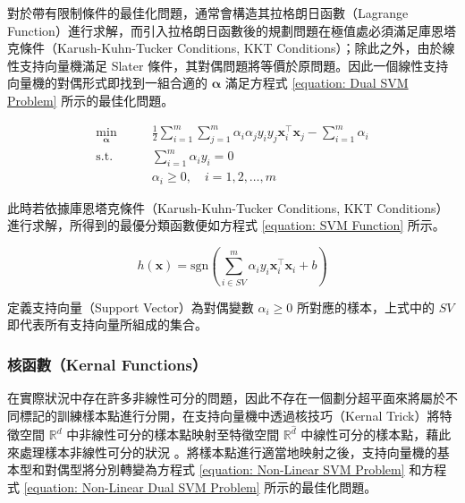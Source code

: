 對於帶有限制條件的最佳化問題，通常會構造其拉格朗日函數（Lagrange Function）進行求解，而引入拉格朗日函數後的規劃問題在極值處必須滿足庫恩塔克條件（Karush-Kuhn-Tucker Conditions, KKT Conditions）；除此之外，由於線性支持向量機滿足 Slater 條件，其對偶問題將等價於原問題。因此一個線性支持向量機的對偶形式即找到一組合適的 $\boldsymbol{\alpha}$ 滿足方程式 \eqref{equation: Dual SVM Problem} 所示的最佳化問題。

\begin{equation}\label{equation: Dual SVM Problem}
  \begin{aligned}
    \min_{\boldsymbol{\alpha}} \qquad & \frac{1}{2} \sum_{i = 1}^{m} \sum_{j = 1}^{m} \alpha_i \alpha_j y_i y_j \boldsymbol{x}_i^{\top} \boldsymbol{x}_j - \sum_{i = 1}^{m} \alpha_{i} \\
    \text{s.t.}                \qquad & \sum_{i = 1}^{m} \alpha_{i} y_{i} = 0 \\
                               \qquad & \alpha_{i} \geq 0 ,\quad i = 1, 2, \ldots, m
  \end{aligned}
\end{equation}

此時若依據庫恩塔克條件（Karush-Kuhn-Tucker Conditions, KKT Conditions）進行求解，所得到的最優分類函數便如方程式 \eqref{equation: SVM Function} 所示。

\begin{equation}\label{equation: SVM Function}
  h(\boldsymbol{x}) = \text{sgn} \left( \sum_{i \in SV}^{m} \alpha_{i}y_{i} \boldsymbol{x}_{i}^{\top} \boldsymbol{x}_{i} + b \right)
\end{equation}

定義支持向量（Support Vector）為對偶變數 $\alpha_{i} \geq 0$ 所對應的樣本，上式中的 $SV$ 即代表所有支持向量所組成的集合。

\subsubsection{核函數（Kernal Functions）}

在實際狀況中存在許多非線性可分的問題，因此不存在一個劃分超平面來將屬於不同標記的訓練樣本點進行分開，在支持向量機中透過核技巧（Kernal Trick）將特徵空間 $\mathbb{R}^{d}$ 中非線性可分的樣本點映射至特徵空間 $\mathbb{R}^{\hat{d}}$ 中線性可分的樣本點，藉此來處理樣本非線性可分的狀況 \cite{boser1992training}。將樣本點進行適當地映射之後，支持向量機的基本型和對偶型將分別轉變為方程式 \eqref{equation: Non-Linear SVM Problem} 和方程式 \eqref{equation: Non-Linear Dual SVM Problem} 所示的最佳化問題。


